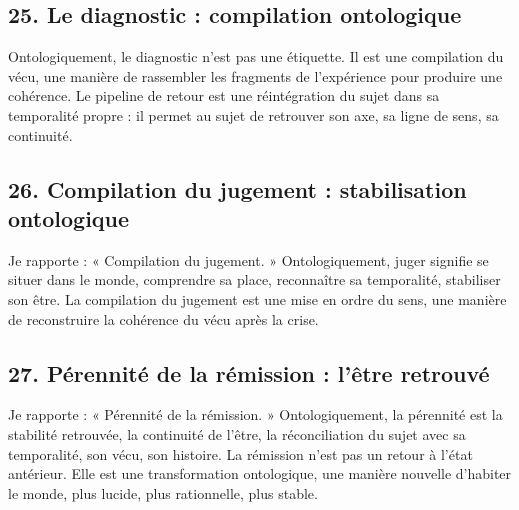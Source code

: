 \documentclass[12pt,letterpaper,oneside]{article}
\begin{document}
\subsection*{25. Le diagnostic : compilation ontologique}
Ontologiquement, le diagnostic n’est pas une étiquette. Il est une compilation du vécu, une manière de rassembler les fragments de l’expérience pour produire une cohérence.
Le pipeline de retour est une réintégration du sujet dans sa temporalité propre : il permet au sujet de retrouver son axe, sa ligne de sens, sa continuité.

\subsection*{26. Compilation du jugement : stabilisation ontologique}
Je rapporte :
« Compilation du jugement. »
Ontologiquement, juger signifie se situer dans le monde, comprendre sa place, reconnaître sa temporalité, stabiliser son être.
La compilation du jugement est une mise en ordre du sens, une manière de reconstruire la cohérence du vécu après la crise.

\subsection*{27. Pérennité de la rémission : l’être retrouvé}
Je rapporte :
« Pérennité de la rémission. »
Ontologiquement, la pérennité est la stabilité retrouvée, la continuité de l’être, la réconciliation du sujet avec sa temporalité, son vécu, son histoire.
La rémission n’est pas un retour à l’état antérieur. Elle est une transformation ontologique, une manière nouvelle d’habiter le monde, plus lucide, plus rationnelle, plus stable.
\end{document}
